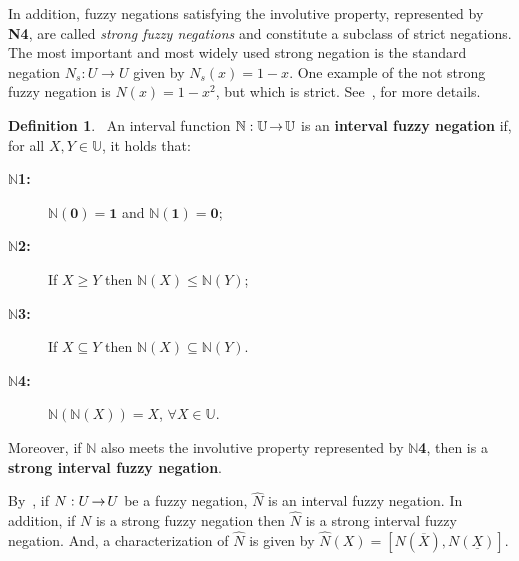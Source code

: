 \documentclass[12pt]{article}
\theoremstyle{plain}
\theoremstyle{remark}
\newtheorem{remark}[theorem]{Remark}
\theoremstyle{definition}
\newtheorem{definition}[theorem]{Definition}
\theoremstyle{proposition}
\newcommand{\lra}{\hspace{-0.05cm}\rightarrow\hspace{-0.05cm}}
\begin{document}
In addition, fuzzy negations satisfying the involutive property, represented by \textbf{N4}, are called \emph{strong fuzzy negations} and constitute a subclass of strict negations. 
The most important and most widely used strong negation is the standard negation $N_{s}:U \rightarrow U$ given by $N_{s}(x)=1-x$. One example of the not strong fuzzy negation is $N(x) = 1- x^{2}$, but which is strict. See~\cite{BBS03}, for more details.
\\
%
\begin{definition}~\cite[Def.~4.1]{BT06b}\label{theo-neg}
An interval function  $\mathbb{N}:\mathbb{U} \lra  \mathbb{U}$ is an \textbf{interval fuzzy negation} if, for all $X,Y \in\mathbb{U}$, it holds that:
\begin{description}
\item[ \textbf{$\mathbb{N}$1:}] $\mathbb{N}(\mathbf{0}) = \mathbf{1}$ and $\mathbb{N}(\mathbf{1}) = \mathbf{0}$; 

\item[ \textbf{$\mathbb{N}$2:}] If $X \geq Y$ then $\mathbb{N}(X)\leq \mathbb{N}(Y)$; 

\item[ \textbf{$\mathbb{N}$3:}] If $X\subseteq Y$ then $\mathbb{N}(X)\subseteq \mathbb{N}(Y)$.

\item[ \textbf{$\mathbb{N}$4:}] $\mathbb{N}(\mathbb{N}(X)) = X$, $\forall X \in \mathbb{U}$.
\end{description}

Moreover, if $\mathbb{N}$ also meets the involutive property represented by \textbf{$\mathbb{N}$4}, then is a \textbf{strong interval fuzzy negation}.
\end{definition}
By~\cite[Theorem4.1.1]{BT06b}, if $N:U \lra U$  be a fuzzy negation, $\widehat{N}$  is an
interval fuzzy negation. In addition, if $N$ is a strong fuzzy
negation then $\widehat{N}$ is a strong interval fuzzy negation. And, a characterization of $\widehat{N}$ is given by $\widehat{N}(X)=[N(\overline{X}),N(\underline{X})]$.\vspace{-0.3cm}
\end{document}
